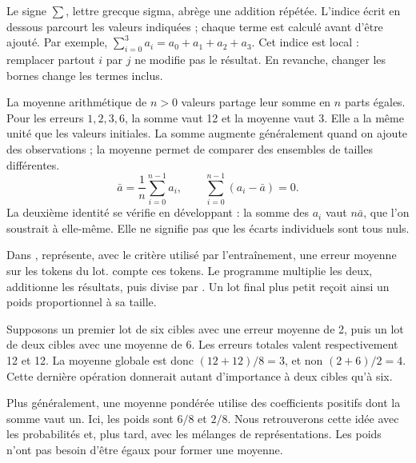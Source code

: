 

Le signe \(\sum\), lettre grecque sigma, abrège une addition répétée.
L'indice écrit en dessous parcourt les valeurs indiquées ; chaque terme
est calculé avant d'être ajouté. Par exemple,
\(\sum_{i=0}^{3}a_i=a_0+a_1+a_2+a_3\).
Cet indice est local : remplacer partout \(i\) par \(j\) ne modifie
pas le résultat. En revanche, changer les bornes change les termes inclus.

La moyenne arithmétique de \(n>0\) valeurs partage leur somme en
\(n\) parts égales. Pour les erreurs \(1,2,3,6\), la somme vaut 12
et la moyenne vaut 3. Elle a la même unité que les valeurs initiales.
La somme augmente généralement quand on ajoute des observations ;
la moyenne permet de comparer des ensembles de tailles différentes.
\[
 \bar a=\frac{1}{n}\sum_{i=0}^{n-1}a_i,
 \qquad
 \sum_{i=0}^{n-1}(a_i-\bar a)=0.
\]
La deuxième identité se vérifie en développant :
la somme des \(a_i\) vaut \(n\bar a\), que l'on soustrait à elle-même.
Elle ne signifie pas que les écarts individuels sont tous nuls.

Dans ,  représente, avec le critère
utilisé par l'entraînement, une erreur moyenne sur les tokens du lot.
 compte ces tokens. Le programme multiplie les deux,
additionne les résultats, puis divise par .
Un lot final plus petit reçoit ainsi un poids proportionnel à sa taille.

Supposons un premier lot de six cibles avec une erreur moyenne de 2,
puis un lot de deux cibles avec une moyenne de 6. Les erreurs totales
valent respectivement 12 et 12. La moyenne globale est donc
\((12+12)/8=3\), et non \((2+6)/2=4\).
Cette dernière opération donnerait autant d'importance à deux cibles
qu'à six.

Plus généralement, une moyenne pondérée utilise des coefficients positifs
dont la somme vaut un. Ici, les poids sont \(6/8\) et \(2/8\).
Nous retrouverons cette idée avec les probabilités et, plus tard,
avec les mélanges de représentations. Les poids n'ont pas besoin
d'être égaux pour former une moyenne.


